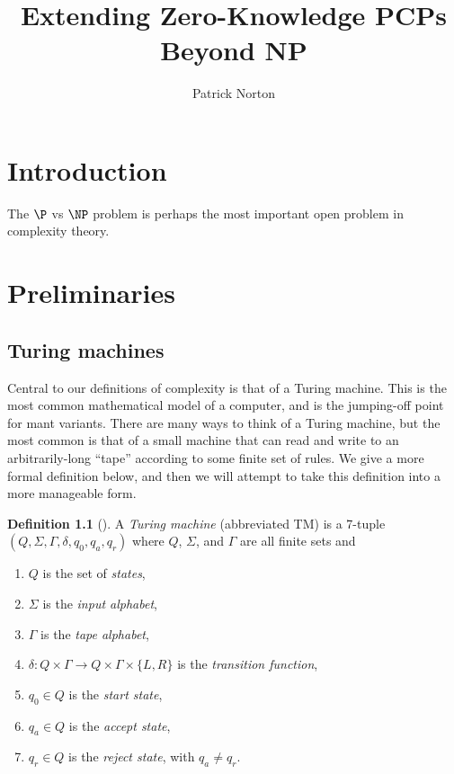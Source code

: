 \documentclass[english,12pt]{reedthesis}
\title{Extending Zero-Knowledge PCPs Beyond NP}
\author{Patrick Norton}
\theoremstyle{plain}
\theoremstyle{definition}
\newtheorem{defn}[defn]{Definition}
\theoremstyle{remark}
\begin{document}
\maketitle

\tableofcontents

\listofalgorithms


\chapter*{Introduction}

The $\P$ vs $\NP$ problem is perhaps the most important open problem in
complexity theory.

\chapter{Preliminaries}


\section{Turing machines}


Central to our definitions of complexity is that of a Turing machine. This is
the most common mathematical model of a computer, and is the jumping-off point
for mant variants. There are many ways to think of a Turing machine, but the
most common is that of a small machine that can read and write to an
arbitrarily-long ``tape'' according to some finite set of rules. We give a more
formal definition below, and then we will attempt to take this definition into a
more manageable form.
\begin{defn}[{\cite[Def.\ 3.1]{Sip97}}]\label{def:TM}
  A \emph{Turing machine} (abbreviated TM) is a 7-tuple
  $(Q, \Sigma, \Gamma, \delta, q_{0}, q_{a}, q_{r})$ where $Q$, $\Sigma$, and $\Gamma$ are all finite
  sets and
  \begin{enumerate}
    \item $Q$ is the set of \emph{states},
    \item $\Sigma$ is the \emph{input alphabet},
    \item $\Gamma$ is the \emph{tape alphabet},
    \item $\delta\colon Q \times \Gamma \rightarrow Q \times \Gamma \times \{L, R\}$ is the \emph{transition function},
    \item $q_{0} \in Q$ is the \emph{start state},
    \item $q_{a} \in Q$ is the \emph{accept state},
    \item $q_{r} \in Q$ is the \emph{reject state}, with $q_{a} \ne q_{r}$.
  \end{enumerate}
\end{defn}
\end{document}
